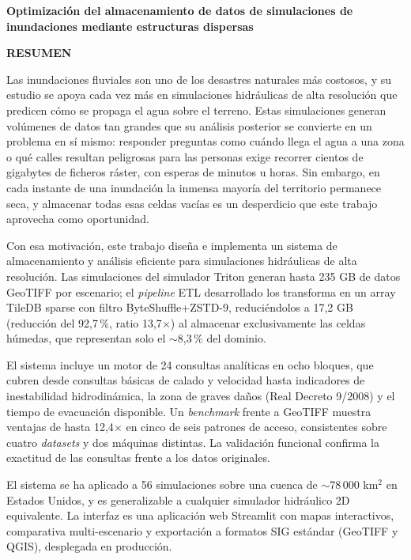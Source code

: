 \begin{center}
{\Large \bfseries Optimización del almacenamiento de datos de simulaciones de inundaciones mediante estructuras dispersas}

\vspace{1cm}
{\Large \bfseries RESUMEN}

\vspace{1.5cm}
\end{center}


Las inundaciones fluviales son uno de los desastres naturales más costosos, y su estudio se apoya cada vez más en simulaciones hidráulicas de alta resolución que predicen cómo se propaga el agua sobre el terreno. Estas simulaciones generan volúmenes de datos tan grandes que su análisis posterior se convierte en un problema en sí mismo: responder preguntas como cuándo llega el agua a una zona o qué calles resultan peligrosas para las personas exige recorrer cientos de gigabytes de ficheros ráster, con esperas de minutos u horas. Sin embargo, en cada instante de una inundación la inmensa mayoría del territorio permanece seca, y almacenar todas esas celdas vacías es un desperdicio que este trabajo aprovecha como oportunidad.

Con esa motivación, este trabajo diseña e implementa un sistema de almacenamiento y análisis eficiente para simulaciones hidráulicas de alta resolución. Las simulaciones del simulador Triton generan hasta 235 GB de datos GeoTIFF por escenario; el \textit{pipeline} ETL desarrollado los transforma en un array TileDB sparse con filtro ByteShuffle+ZSTD-9, reduciéndolos a 17,2 GB (reducción del 92,7\,\%, ratio 13,7$\times$) al almacenar exclusivamente las celdas húmedas, que representan solo el $\sim$8,3\,\% del dominio.

El sistema incluye un motor de 24 consultas analíticas en ocho bloques, que cubren desde consultas básicas de calado y velocidad hasta indicadores de inestabilidad hidrodinámica, la zona de graves daños (Real Decreto 9/2008) y el tiempo de evacuación disponible. Un \textit{benchmark} frente a GeoTIFF muestra ventajas de hasta 12,4$\times$ en cinco de seis patrones de acceso, consistentes sobre cuatro \textit{datasets} y dos máquinas distintas. La validación funcional confirma la exactitud de las consultas frente a los datos originales.

El sistema se ha aplicado a 56 simulaciones sobre una cuenca de $\sim$78\,000 km$^2$ en Estados Unidos, y es generalizable a cualquier simulador hidráulico 2D equivalente. La interfaz es una aplicación web Streamlit con mapas interactivos, comparativa multi-escenario y exportación a formatos SIG estándar (GeoTIFF y QGIS), desplegada en producción.


